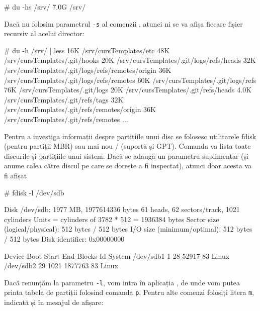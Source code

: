 \begin{screen}
# du -hs /srv/
7.0G    /srv/
\end{screen}

Dacă nu folosim parametrul \texttt{-s} al comenzii , atunci ni se va
afișa fiecare fișier recursiv al acelui director:

\begin{screen}
# du -h /srv/ | less
16K     /srv/cursTemplates/etc
48K     /srv/cursTemplates/.git/hooks
20K     /srv/cursTemplates/.git/logs/refs/heads
32K     /srv/cursTemplates/.git/logs/refs/remotes/origin
36K     /srv/cursTemplates/.git/logs/refs/remotes
60K     /srv/cursTemplates/.git/logs/refs
76K     /srv/cursTemplates/.git/logs
20K     /srv/cursTemplates/.git/refs/heads
4.0K    /srv/cursTemplates/.git/refs/tags
32K     /srv/cursTemplates/.git/refs/remotes/origin
36K     /srv/cursTemplates/.git/refs/remotes
...
\end{screen}


Pentru a investiga informații despre partițiile unui disc se folosesc
utilitarele fdisk (pentru partiții MBR) sau mai nou /
(suportă și GPT). Comanda  va lista toate discurile și partițiile
unui sistem. Dacă se adaugă un parametru suplimentar (și anume calea către
discul pe care se dorește a fi inspectat), atunci doar acesta va fi afișat

\begin{screen}
# fdisk -l /dev/sdb


Disk /dev/sdb: 1977 MB, 1977614336 bytes
61 heads, 62 sectors/track, 1021 cylinders
Units = cylinders of 3782 * 512 = 1936384 bytes
Sector size (logical/physical): 512 bytes / 512 bytes
I/O size (minimum/optimal): 512 bytes / 512 bytes
Disk identifier: 0x00000000


   Device Boot      Start         End      Blocks   Id  System
/dev/sdb1               1          28       52917   83  Linux
/dev/sdb2              29        1021     1877763   83  Linux
\end{screen}

Dacă renunțăm la parametru \texttt{-l}, vom intra în aplicația , de
unde vom putea printa tabela de partiții folosind comanda \texttt{p}. Pentru
alte comenzi folosiți litera \texttt{m}, indicată și în mesajul de afișare:

